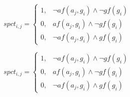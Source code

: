 \documentclass[a4paper]{article}
\begin{document}
\begin{equation}
spct_{i,j} =
\begin{cases}
1, & \text{$\neg af(a_j,g_i) \wedge \neg gf(g_i)$}\\
0, & \text{$af(a_j,g_i) \wedge \neg gf(g_i)$}\\
0, & \text{$\neg af(a_j,g_i) \wedge gf(g_i)$}
\end{cases}
\end{equation}

\begin{equation}
spct_{i,j} =
\begin{cases}
1, & \text{$\neg af(a_j,g_i) \wedge \neg gf(g_i)$}\\
0, & \text{$af(a_j,g_i) \wedge \neg gf(g_i)$}\\
0, & \text{$\neg af(a_j,g_i) \wedge gf(g_i)$}
\end{cases}
\end{equation}
\end{document}
